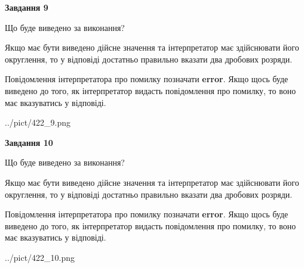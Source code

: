 \documentclass[12pt, ukrainian]{article}
\begin{document}
{\begin {Large}
{\begin {center}\textbf{Завдання 9}\end {center}}\par
Що буде виведено за виконання? \par

Якщо має бути виведено дійсне значення та інтерпретатор має здійснювати його округлення, 
то у відповіді достатньо правильно вказати два дробових розряди.

Повідомлення інтерпретатора про помилку позначати \textbf{error}.
Якщо щось буде виведено до того, як інтерпретатор видасть повідомлення про помилку, 
то воно має вказуватись у відповіді. \par

\begin{center}
	{../pict/422_9.png}
\end{center}
\newpage

{\begin {center}\textbf{Завдання 10}\end {center}}\par
Що буде виведено за виконання? \par

Якщо має бути виведено дійсне значення та інтерпретатор має здійснювати його округлення, 
то у відповіді достатньо правильно вказати два дробових розряди.

Повідомлення інтерпретатора про помилку позначати \textbf{error}.
Якщо щось буде виведено до того, як інтерпретатор видасть повідомлення про помилку, 
то воно має вказуватись у відповіді. \par

\begin{center}
	{../pict/422_10.png}
\end{center}
\newpage

\end {Large}}
\end{document}
